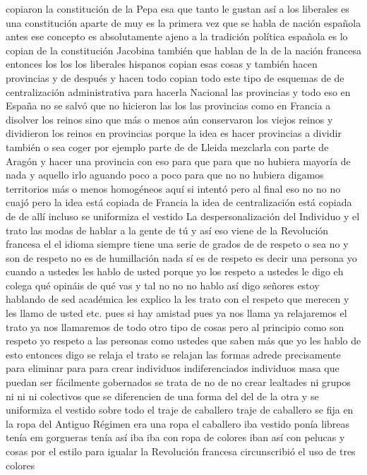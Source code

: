 copiaron la constitución de la Pepa esa que tanto le gustan así a los liberales es una constitución aparte de muy
es la primera vez que se habla de nación española antes ese concepto es absolutamente ajeno a la tradición política española
es lo copian de la constitución Jacobina también que hablan de la de la nación francesa entonces los los los liberales hispanos
copian esas cosas y también hacen provincias y de después y hacen todo copian todo este tipo de esquemas de
de centralización administrativa para hacerla Nacional las provincias y todo eso en España no se salvó
que no hicieron las los las provincias como en Francia a disolver los reinos sino que más o menos aún conservaron los viejos reinos
y dividieron los reinos en provincias porque la idea es hacer provincias a dividir también
o sea coger por ejemplo parte de de Lleida mezclarla con parte de Aragón y hacer una provincia con eso
para que para que no hubiera mayoría de nada y aquello irlo aguando poco a poco para que no no hubiera digamos territorios más o menos homogéneos
aquí si intentó pero al final eso no no no cuajó pero la idea está copiada de Francia
la idea de centralización está copiada de de allí incluso se uniformiza el vestido
La despersonalización del Individuo
y el trato las modas de hablar a la gente de tú y así eso viene de la Revolución francesa
el el idioma siempre tiene una serie de grados de de respeto o sea no y son de respeto no es de humillación nada
sí es de respeto es decir una persona yo cuando a ustedes les hablo de usted porque yo los respeto a ustedes
le digo eh colega qué opináis de qué vas y tal no no no hablo así digo señores estoy hablando de sed académica
les explico la les trato con el respeto que merecen y les llamo de usted etc. pues si hay amistad pues ya nos llama
ya relajaremos el trato ya nos llamaremos de todo otro tipo de cosas pero al principio como son respeto
yo respeto a las personas como ustedes que saben más que yo les hablo de esto entonces digo
se relaja el trato se relajan las formas adrede precisamente para eliminar para para crear individuos indiferenciados
individuos masa que puedan ser fácilmente gobernados se trata de no de no crear lealtades ni grupos ni ni ni colectivos
que se diferencien de una forma del del de la otra y se uniformiza el vestido sobre todo el traje de caballero
traje de caballero se fija en la ropa del Antiguo Régimen era una ropa el caballero iba vestido
ponía libreas tenía em gorgueras tenía así iba iba con ropa de colores
iban así con pelucas y cosas por el estilo para igualar la Revolución francesa circunscribió el uso de tres colores
